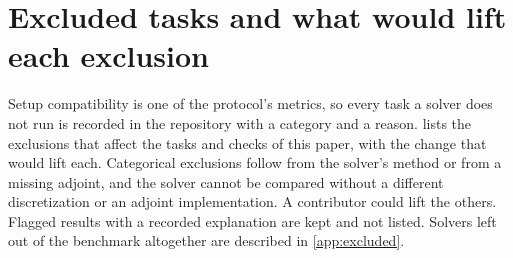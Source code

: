 \section{Excluded tasks and what would lift each exclusion}
\label{app:exclusions}

Setup compatibility is one of the protocol's metrics, so every task a
solver does not run is recorded in the repository with a category and a
reason.  lists the exclusions that affect the
tasks and checks of this paper, with the change that would lift each.
Categorical exclusions follow from the solver's method or from a missing
adjoint, and the solver cannot be compared without a different
discretization or an adjoint implementation. A contributor could lift the
others. Flagged results with a recorded explanation are kept and not
listed. Solvers left out of the
benchmark altogether are described in \cref{app:excluded}.

